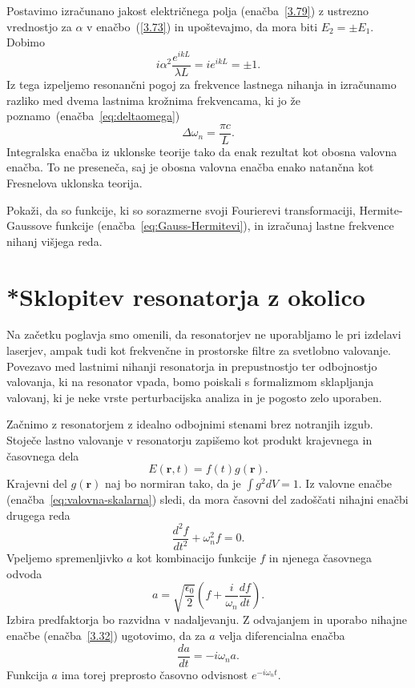 Postavimo izračunano jakost električnega
polja (enačba~\ref{3.79}) z ustrezno vrednostjo za $\alpha$ v 
enačbo~(\ref{3.73}) in upoštevajmo, da mora biti
$E_{2}=\pm E_{1}$. Dobimo
\begin{equation}
i\alpha^{2}\frac{e^{ikL}}{\lambda L}=ie^{ikL}=\pm1.
\label{3.80}
\end{equation}
Iz tega izpeljemo resonančni pogoj za frekvence lastnega nihanja 
in izračunamo razliko med dvema lastnima krožnima frekvencama, 
ki jo že poznamo~(enačba~\ref{eq:deltaomega})
\begin{equation}
\Delta \omega_n=\frac{\pi c}{L}.
\label{3.81}
\end{equation}
Integralska enačba iz uklonske teorije tako da
enak rezultat kot obosna valovna enačba. To ne preseneča, saj je
obosna valovna enačba enako natančna kot Fresnelova uklonska teorija.
\begin{naloga}
Pokaži, da so funkcije, ki so sorazmerne svoji Fourierevi transformaciji, 
Hermite-Gaussove funkcije (enačba~\ref{eq:Gauss-Hermitevi}), 
in izračunaj lastne frekvence nihanj višjega reda.
\end{naloga}

\section{*Sklopitev resonatorja z okolico}
Na začetku poglavja smo omenili, da resonatorjev ne uporabljamo le pri 
izdelavi laserjev, ampak tudi kot frekvenčne in
prostorske filtre za svetlobno valovanje. Povezavo med lastnimi nihanji
resonatorja in prepustnostjo ter odbojnostjo valovanja, ki na resonator
vpada, bomo poiskali s formalizmom sklapljanja valovanj, 
ki je neke vrste perturbacijska analiza in je pogosto zelo uporaben.

Začnimo z resonatorjem z idealno odbojnimi stenami brez notranjih izgub. Stoječe
lastno valovanje v resonatorju zapišemo kot produkt krajevnega in časovnega
dela
\begin{equation}
E(\mathbf{r},t)=f(t)g(\mathbf{r}).
\label{3.31}
\end{equation}
Krajevni del $g(\mathbf{r})$ naj bo normiran tako, da je $\int g^{2}dV=1$. Iz valovne
enačbe (enačba~\ref{eq:valovna-skalarna}) sledi, da mora časovni del zadoščati 
nihajni enačbi drugega reda
\begin{equation}
\frac{d^2f}{dt^2} + \omega_{n}^{2}f=0.
\label{3.32}
\end{equation}
Vpeljemo spremenljivko $a$ kot kombinacijo funkcije $f$ in njenega
časovnega odvoda
\begin{equation}
a=\sqrt{\frac{\epsilon_{0}}{2}}(f+\frac{i}{\omega_{n}}\frac{df}{dt}).
\label{3.33}
\end{equation}
Izbira predfaktorja bo razvidna v nadaljevanju. 
Z odvajanjem in uporabo nihajne enačbe (enačba~\ref{3.32}) ugotovimo, da za $a$ velja 
diferencialna enačba 
\begin{equation}
\frac{da}{dt}=-i\omega_{n}a.
\label{3.34}
\end{equation}
Funkcija $a$ ima torej preprosto časovno odvisnost $e^{-i\omega_{n}t}$.

